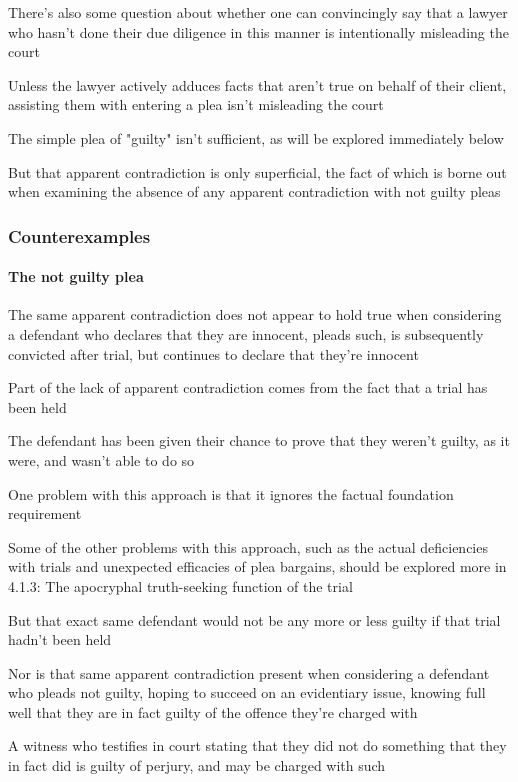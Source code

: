 There's also some question about whether one can convincingly say that a lawyer who hasn't done their due diligence in this manner is intentionally misleading the court

Unless the lawyer actively adduces facts that aren't true on behalf of their client, assisting them with entering a plea isn't misleading the court

The simple plea of "guilty" isn't sufficient, as will be explored immediately below

But that apparent contradiction is only superficial, the fact of which is borne out when examining the absence of any apparent contradiction with not guilty pleas

\subsubsection{Counterexamples}

\paragraph{The not guilty plea\\}

The same apparent contradiction does not appear to hold true when considering a defendant who declares that they are innocent, pleads such, is subsequently convicted after trial, but continues to declare that they're innocent

Part of the lack of apparent contradiction comes from the fact that a trial has been held

The defendant has been given their chance to prove that they weren't guilty, as it were, and wasn't able to do so

One problem with this approach is that it ignores the factual foundation requirement

Some of the other problems with this approach, such as the actual deficiencies with trials and unexpected efficacies of plea bargains, should be explored more in 4.1.3: The apocryphal truth-seeking function of the trial

But that exact same defendant would not be any more or less guilty if that trial hadn't been held

Nor is that same apparent contradiction present when considering a defendant who pleads not guilty, hoping to succeed on an evidentiary issue, knowing full well that they are in fact guilty of the offence they're charged with

A witness who testifies in court stating that they did not do something that they in fact did is guilty of perjury, and may be charged with such

